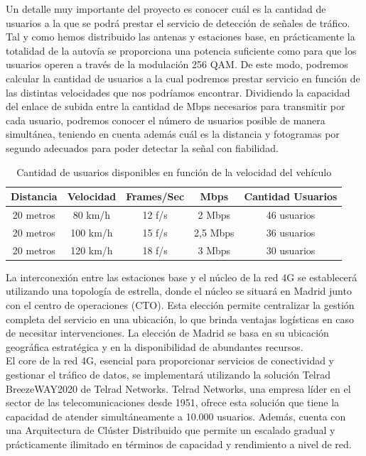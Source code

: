 Un detalle muy importante del proyecto es conocer cuál es la cantidad de usuarios a la que se podrá prestar el servicio de detección de señales de tráfico. Tal y como hemos distribuido las antenas y estaciones base, en prácticamente la totalidad de la autovía se proporciona una potencia suficiente como para que los usuarios operen a través de la modulación 256 QAM. De este modo, podremos calcular la cantidad de usuarios a la cual podremos prestar servicio en función de las distintas velocidades que nos podríamos encontrar.  Dividiendo la capacidad del enlace de subida entre la cantidad de Mbps necesarios para transmitir por cada usuario, podremos conocer el número de usuarios posible de manera simultánea, teniendo en cuenta además cuál es la distancia y fotogramas por segundo adecuados para poder detectar la señal con fiabilidad.

\begin{table}[H]
\centering
\begin{tabular}{|c|c|c|c|c|}
\hline
\textbf{Distancia} & \textbf{Velocidad} & \textbf{Frames/Sec} & \textbf{Mbps} & \textbf{Cantidad Usuarios} \\ \hline \hline
20 metros          & 80 km/h            & 12 f/s              & 2 Mbps        & 46 usuarios                \\ \hline
20 metros          & 100 km/h           & 15 f/s              & 2,5 Mbps      & 36 usuarios                \\ \hline
20 metros          & 120 km/h           & 18 f/s              & 3 Mbps        & 30 usuarios                \\ \hline
\end{tabular}
\caption{Cantidad de usuarios disponibles en función de la velocidad del vehículo }
\label{users}
\end{table}

La interconexión entre las estaciones base y el núcleo de la red 4G se establecerá utilizando una topología de estrella, donde el núcleo se situará en Madrid junto con el centro de operaciones (CTO). Esta elección permite centralizar la gestión completa del servicio en una ubicación, lo que brinda ventajas logísticas en caso de necesitar intervenciones. La elección de Madrid se basa en su ubicación geográfica estratégica y en la disponibilidad de abundantes recursos.\\

El core de la red 4G, esencial para proporcionar servicios de conectividad y gestionar el tráfico de datos, se implementará utilizando la solución Telrad BreezeWAY2020 de Telrad Networks. Telrad Networks, una empresa líder en el sector de las telecomunicaciones desde 1951, ofrece esta solución que tiene la capacidad de atender simultáneamente a 10.000 usuarios. Además, cuenta con una Arquitectura de Clúster Distribuido que permite un escalado gradual y prácticamente ilimitado en términos de capacidad y rendimiento a nivel de red.\\

